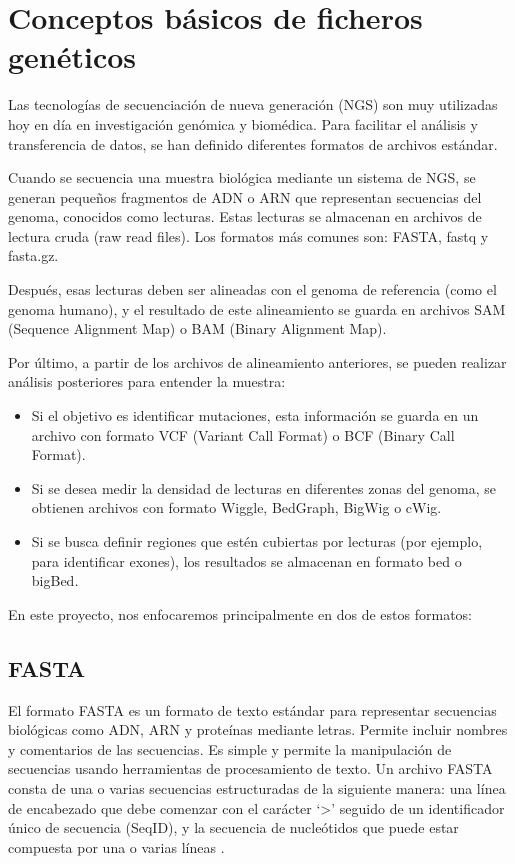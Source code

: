 \documentclass[11pt,spanish,listoffigures,listoftables]{tfgetsinf}
\begin{document}
\section{Conceptos básicos de ficheros genéticos}

Las tecnologías de secuenciación de nueva generación (\acs{NGS}) son muy utilizadas hoy en día en investigación genómica y biomédica. Para facilitar el análisis y transferencia de datos, se han definido diferentes formatos de archivos estándar. 

Cuando se secuencia una muestra biológica mediante un sistema de \acs{NGS}, se generan pequeños fragmentos de \acs{ADN} o \acs{ARN} que representan secuencias del genoma, conocidos como lecturas. Estas lecturas se almacenan en archivos de lectura cruda (raw read files). Los formatos más comunes son: \acs{FASTA}, fastq y fasta.gz. 

Después, esas lecturas deben ser alineadas con el genoma de referencia (como el genoma humano), y el resultado de este alineamiento se guarda en archivos SAM (Sequence Alignment Map) o BAM (Binary Alignment Map). 

Por último, a partir de los archivos de alineamiento anteriores, se pueden realizar análisis posteriores para entender la muestra:  

\begin{itemize}
   \item Si el objetivo es identificar mutaciones, esta información se guarda en un archivo con formato \acs{VCF} (Variant Call Format) o BCF (Binary Call Format). 
   \item Si se desea medir la densidad de lecturas en diferentes zonas del genoma, se obtienen archivos con formato Wiggle, BedGraph, BigWig o cWig.
   \item Si se busca definir regiones que estén cubiertas por lecturas (por ejemplo, para identificar exones), los resultados se almacenan en formato bed o bigBed.
\end{itemize}

En este proyecto, nos enfocaremos principalmente en dos de estos formatos: 

\subsection{FASTA}

El formato \acs{FASTA} es un formato de texto estándar para representar secuencias biológicas como \acs{ADN}, \acs{ARN} y proteínas mediante letras. Permite incluir nombres y comentarios de las secuencias. Es simple y permite la manipulación de secuencias usando herramientas de procesamiento de texto\cite{JAV}. Un archivo \acs{FASTA} consta de una o varias secuencias estructuradas de la siguiente manera: una línea de encabezado que debe comenzar con el carácter ‘>’ seguido de un identificador único de secuencia (SeqID), y la secuencia de nucleótidos que puede estar compuesta por una o varias líneas \cite{FAS}.
\end{document}

